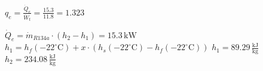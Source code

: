 \( q_{e} = \frac{\dot{Q}_{e}}{\dot{W}_{t}} = \frac{15.3}{11.8} = 1.323 \)  

\( \dot{Q}_{e} = \dot{m}_{R134a} \cdot (h_{2} - h_{1}) = 15.3 \, \text{kW} \)  
\( h_{1} = h_{f}(-22^\circ \text{C}) + x \cdot (h_{s}(-22^\circ \text{C}) - h_{f}(-22^\circ \text{C})) \)  
\( h_{1} = 89.29 \, \frac{\text{kJ}}{\text{kg}} \)  
\( h_{2} = 234.08 \, \frac{\text{kJ}}{\text{kg}} \)